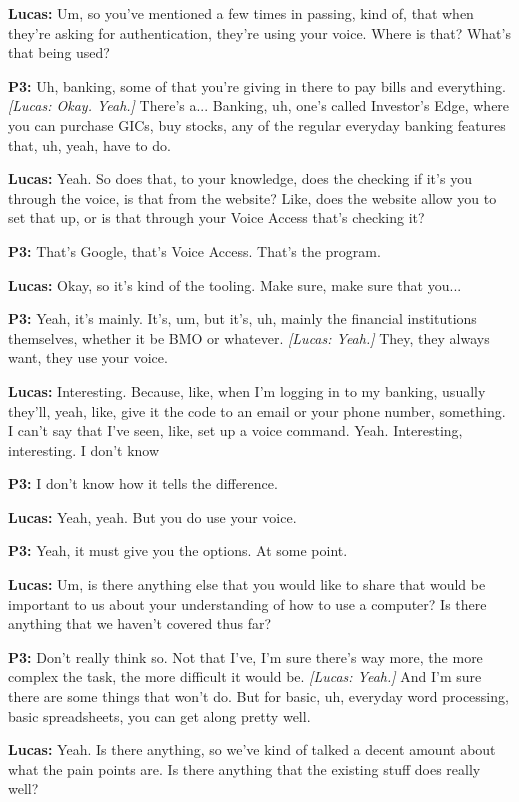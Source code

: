 \textbf{Lucas:} Um, so you've mentioned a few times in passing, kind of, that when they're asking for authentication, they're using your voice. Where is that? What's that being used? 

\textbf{P3:} Uh, banking, some of that you're giving in there to pay bills and everything. \textit{[Lucas: Okay. Yeah.]} There's a... Banking, uh, one's called Investor's Edge, where you can purchase GICs, buy stocks, any of the regular everyday banking features that, uh, yeah, have to do. 

\textbf{Lucas:} Yeah. So does that, to your knowledge, does the checking if it's you through the voice, is that from the website? Like, does the website allow you to set that up, or is that through your Voice Access that's checking it? 

\textbf{P3:} That's Google, that's Voice Access. That's the program. 

\textbf{Lucas:} Okay, so it's kind of the tooling. Make sure, make sure that you... 

\textbf{P3:} Yeah, it's mainly. It's, um, but it's, uh, mainly the financial institutions themselves, whether it be BMO or whatever. \textit{[Lucas: Yeah.]} They, they always want, they use your voice. 

\textbf{Lucas:} Interesting. Because, like, when I'm logging in to my banking, usually they'll, yeah, like, give it the code to an email or your phone number, something. I can't say that I've seen, like, set up a voice command. Yeah. Interesting, interesting. I don't know 

\textbf{P3:} I don't know how it tells the difference. 

\textbf{Lucas:} Yeah, yeah. But you do use your voice. 

\textbf{P3:} Yeah, it must give you the options. At some point. 

\textbf{Lucas:} Um, is there anything else that you would like to share that would be important to us about your understanding of how to use a computer? Is there anything that we haven't covered thus far? 

\textbf{P3:} Don't really think so. Not that I've, I'm sure there's way more, the more complex the task, the more difficult it would be. \textit{[Lucas: Yeah.]} And I'm sure there are some things that won't do. But for basic, uh, everyday word processing, basic spreadsheets, you can get along pretty well. 

\textbf{Lucas:} Yeah. Is there anything, so we've kind of talked a decent amount about what the pain points are. Is there anything that the existing stuff does really well? 

